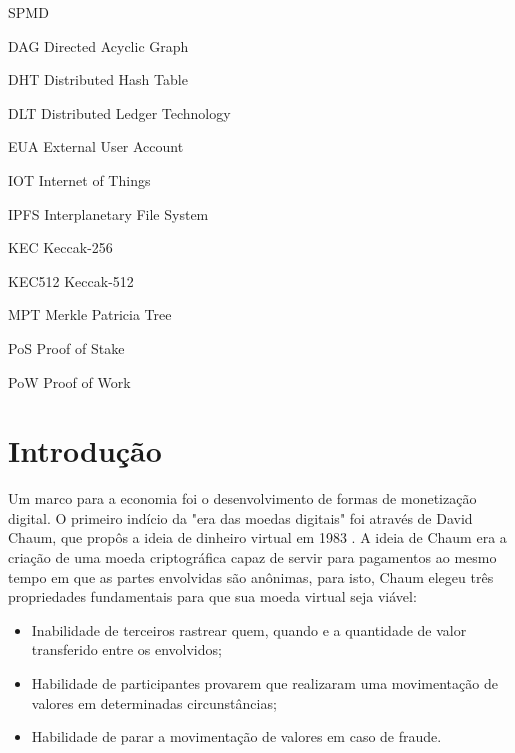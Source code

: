 \documentclass[tcc,capa]{texufpel}
\begin{document}
\listoffigures

\listoftables

\begin{listofabbrv}{SPMD}
        \item[DAG] Directed Acyclic Graph
        \item[DHT] Distributed Hash Table
        \item[DLT] Distributed Ledger Technology
        \item[EUA] External User Account 
        \item[IOT] Internet of Things
        \item[IPFS] Interplanetary File System
        \item[KEC] Keccak-256
        \item[KEC512] Keccak-512
        \item[MPT] Merkle Patricia Tree
        \item[PoS] Proof of Stake
        \item[PoW] Proof of Work
\end{listofabbrv}

\tableofcontents

\chapter{Introdução}

    Um marco para a economia foi o desenvolvimento de formas de monetização digital. O primeiro indício da "era das moedas digitais" foi através de David Chaum, que propôs a ideia de dinheiro virtual em 1983 \cite{chaum1983blind}. A ideia de Chaum era a criação de uma moeda criptográfica capaz de servir para pagamentos ao mesmo tempo em que as partes envolvidas são anônimas, para isto, Chaum elegeu três propriedades fundamentais para que sua moeda virtual seja viável: 
	
	\begin{itemize}
	    \item Inabilidade de terceiros rastrear quem, quando e a quantidade de valor transferido entre os envolvidos;
	    \item Habilidade de participantes provarem que realizaram uma movimentação de valores em determinadas circunstâncias;
	    \item Habilidade de parar a movimentação de valores em caso de fraude.
	\end{itemize}
	
\end{document}
